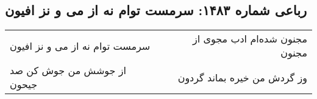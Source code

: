 \begin{center}
\section*{رباعی شماره ۱۴۸۳: سرمست توام نه از می و نز افیون}
\label{sec:1483}
\begin{longtable}{l p{0.5cm} r}
سرمست توام نه از می و نز افیون
&&
مجنون شده‌ام ادب مجوی از مجنون
\\
از جوشش من جوش کن صد جیحون
&&
وز گردش من خیره بماند گردون
\\
\end{longtable}
\end{center}
